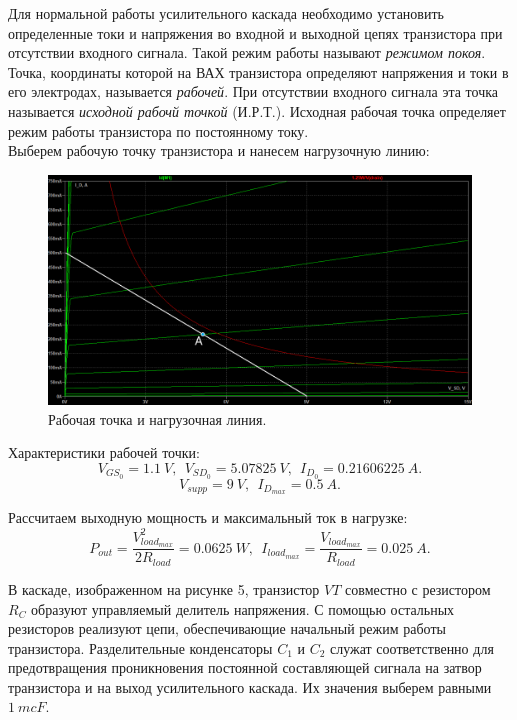 \documentclass[12pt]{article}
\begin{document}
Для нормальной работы усилительного каскада необходимо установить определенные токи и напряжения во входной и выходной цепях транзистора при отсутствии входного сигнала. Такой режим работы называют \emph{режимом покоя}. \\

Точка, координаты которой на ВАХ транзистора определяют напряжения и токи в его электродах, называется \emph{рабочей}. При отсутствии входного сигнала эта точка называется \emph{исходной рабочй точкой} (И.Р.Т.). Исходная рабочая точка определяет режим работы транзистора по постоянному току. \\

Выберем рабочую точку транзистора и нанесем нагрузочную линию:
\begin{figure}[H]
    \centering
    \includegraphics[width=\textwidth]{2_output_with_max_power_line_small_and_load_line_and_work_dot.png}
    \caption{Рабочая точка и нагрузочная линия.}
    \label{fig:2_output_with_max_power_line_small_and_load_line_and_work_dot}
\end{figure}

Характеристики рабочей точки:
\[
    V_{GS_0} = 1.1 \ V, \ \ V_{SD_0} = 5.07825 \ V, \ \ I_{D_0} = 0.21606225 \ A.
\]
\[
    V_{supp} = 9 \ V, \ \ I_{D_{max}} = 0.5 \ A.
\]

Рассчитаем выходную мощность и максимальный ток в нагрузке:
\[
    P_{out} = \frac{V_{load_{max}}^2}{2R_{load}} = 0.0625 \ W, \ \ I_{load_{max}} = \frac{V_{load_{max}}}{R_{load}} = 0.025 \ A.
\]

В каскаде, изображенном на рисунке 5, транзистор $VT$ совместно с резистором $R_C$ образуют управляемый делитель напряжения. С помощью остальных резисторов реализуют цепи, обеспечивающие начальный режим работы транзистора. Разделительные конденсаторы $C_1$ и $C_2$ служат соответственно для предотвращения проникновения постоянной составляющей сигнала на затвор транзистора и на выход усилительного каскада. Их значения выберем равными $1 \ mcF$.
\end{document}
